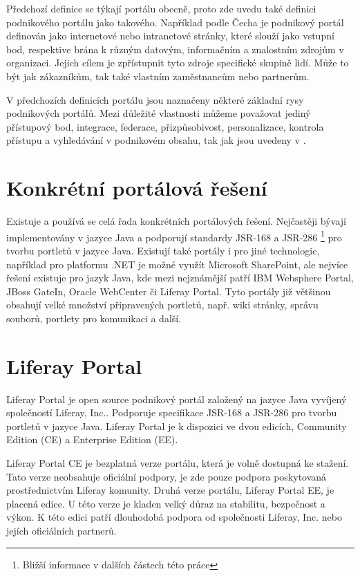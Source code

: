 \documentclass{fithesis}
\begin{document}
Předchozí definice se týkají portálu obecně, proto zde uvedu také definici podnikového portálu jako takového. Například podle Čecha je podnikový portál definován jako internetové nebo intranetové stránky, které slouží jako vstupní bod, respektive brána k různým datovým, informačním a znalostním zdrojům v organizaci. Jejich cílem je zpřístupnit tyto zdroje specifické skupině lidí. Může to být jak zákazníkům, tak také vlastním zaměstnancům nebo partnerům. \cite{cech}

V předchozích definicích portálu jsou naznačeny některé základní rysy podnikových portálů. Mezi důležité vlastnosti můžeme považovat jediný přístupový bod, integrace, federace, přizpůsobivost, personalizace, kontrola přístupu a vyhledávání v podnikovém obsahu, tak jak jsou uvedeny v \cite{enterprise-portal}.

\section{Konkrétní portálová řešení}
Existuje a používá se celá řada konkrétních portálových řešení. Nejčastěji bývají implementovány v jazyce Java a podporují standardy JSR-168 a JSR-286 \footnote[2]{Bližší informace v dalších částech této práce} pro tvorbu portletů v jazyce Java. Existují také portály i pro jiné technologie, například pro platformu .NET je možné využít Microsoft SharePoint, ale nejvíce řešení existuje pro jazyk Java, kde mezi nejznámější patří IBM Websphere Portal, JBoss GateIn, Oracle WebCenter či Liferay Portal. Tyto portály již většinou obsahují velké množství připravených portletů, např. wiki stránky, správu souborů, portlety pro komunikaci a další.

\section{Liferay Portal}
Liferay Portal je open source podnikový portál založený na jazyce Java vyvíjený společností Liferay, Inc.. Podporuje specifikace JSR-168 a JSR-286 pro tvorbu portletů v jazyce Java. Liferay Portal je k dispozici ve dvou edicích, Community Edition (CE) a Enterprise Edition (EE).

Liferay Portal CE je bezplatná verze portálu, která je volně dostupná ke stažení. Tato verze neobsahuje oficiální podpory, je zde pouze podpora poskytovaná prostřednictvím Liferay komunity. Druhá verze portálu, Liferay Portal EE, je placená edice. U této verze je kladen velký důraz na stabilitu, bezpečnost a výkon. K této edici patří dlouhodobá podpora od společnosti Liferay, Inc. nebo jejích oficiálních partnerů.
\end{document}
